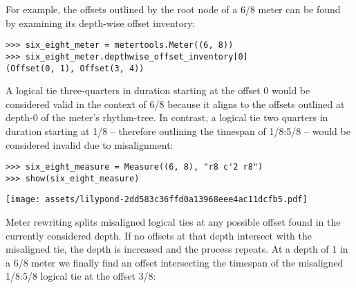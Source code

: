 For example, the offsets outlined by the root node of a 6/8 meter can be found
by examining its depth-wise offset inventory:

\begin{comment}
<abjad>
six_eight_meter = metertools.Meter((6, 8))
six_eight_meter.depthwise_offset_inventory[0]
</abjad>
\end{comment}

\begin{abjadbookoutput}
\begin{singlespacing}
\vspace{-0.5\baselineskip}
\begin{lstlisting}
>>> six_eight_meter = metertools.Meter((6, 8))
>>> six_eight_meter.depthwise_offset_inventory[0]
(Offset(0, 1), Offset(3, 4))
\end{lstlisting}
\end{singlespacing}
\end{abjadbookoutput}

\noindent A logical tie three-quarters in duration starting at the offset 0
would be considered valid in the context of 6/8 because it aligns to the
offsets outlined at depth-0 of the meter's rhythm-tree. In contrast, a logical
tie two quarters in duration starting at 1/8 -- therefore outlining the
timespan of 1/8:5/8 -- would be considered invalid due to misalignment:

\begin{comment}
<abjad>
six_eight_measure = Measure((6, 8), "r8 c'2 r8")
show(six_eight_measure)
</abjad>
\end{comment}

\begin{abjadbookoutput}
\begin{singlespacing}
\vspace{-0.5\baselineskip}
\begin{lstlisting}
>>> six_eight_measure = Measure((6, 8), "r8 c'2 r8")
>>> show(six_eight_measure)
\end{lstlisting}
\noindent\texttt{[image: assets/lilypond-2dd583c36ffd0a13968eee4ac11dcfb5.pdf]}
\end{singlespacing}
\end{abjadbookoutput}

\noindent Meter rewriting splits misaligned logical ties at any possible offset
found in the currently considered depth. If no offsets at that depth intersect
with the misaligned tie, the depth is increased and the process repeats. At a
depth of 1 in a 6/8 meter we finally find an offset intersecting the timespan
of the misaligned 1/8:5/8 logical tie at the offset 3/8:

